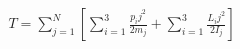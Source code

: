 \documentclass[preview]{standalone}
\begin{document}
\begin{align*}
T = \sum_{j=1}^N\left[ \sum_{i=1}^3\frac{p_ij^2}{2m_j} + \sum_{i=1}^3\frac{L_ij^2}{2I_j} \right]
\end{align*}
\end{document}
